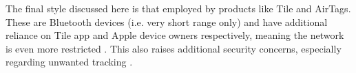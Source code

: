 The final style discussed here is that employed by products like Tile and AirTags. 
These are Bluetooth devices (i.e. very short 
range only) and have additional reliance on Tile app and Apple device owners respectively, 
meaning the network is even more restricted \cite{tile}.
This also raises additional security concerns, especially regarding 
unwanted tracking \cite{haskell2021, lovejoy2021}.
